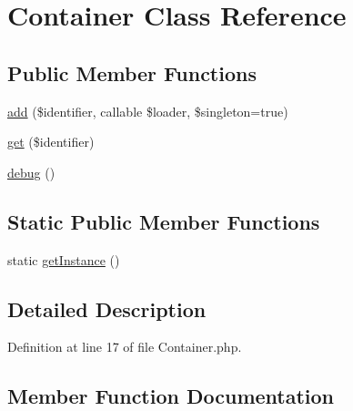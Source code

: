 \hypertarget{class_zest_1_1_common_1_1_container_1_1_container}{}\section{Container Class Reference}
\label{class_zest_1_1_common_1_1_container_1_1_container}
\subsection*{Public Member Functions}
\begin{DoxyCompactItemize}
\item 
\mbox{\hyperlink{class_zest_1_1_common_1_1_container_1_1_container_a3364b3b2c86dee9ad78b8be07d4b5e89}{add}} (\$identifier, callable \$loader, \$singleton=true)
\item 
\mbox{\hyperlink{class_zest_1_1_common_1_1_container_1_1_container_a711e1d65eb5a7930db612a76ea3bddab}{get}} (\$identifier)
\item 
\mbox{\hyperlink{class_zest_1_1_common_1_1_container_1_1_container_aaed74f7942d3fc56582e99324500e87b}{debug}} ()
\end{DoxyCompactItemize}
\subsection*{Static Public Member Functions}
\begin{DoxyCompactItemize}
\item 
static \mbox{\hyperlink{class_zest_1_1_common_1_1_container_1_1_container_ac93fbec81f07e5d15f80db907e63dc10}{get\+Instance}} ()
\end{DoxyCompactItemize}


\subsection{Detailed Description}


Definition at line 17 of file Container.\+php.



\subsection{Member Function Documentation}
\mbox{\label{class_zest_1_1_common_1_1_container_1_1_container_a3364b3b2c86dee9ad78b8be07d4b5e89}} 
